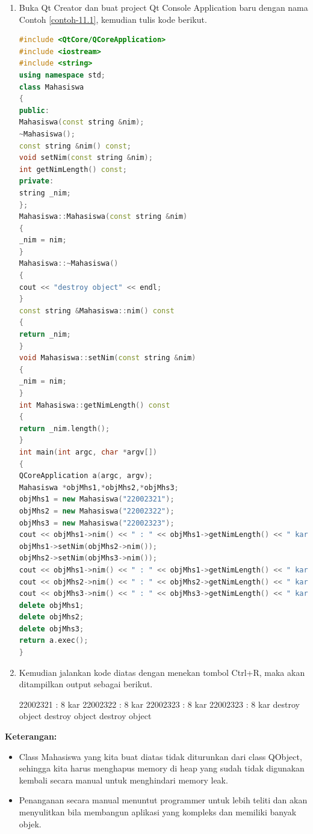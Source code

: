 \begin{enumerate}

\item
  Buka Qt Creator dan buat project Qt Console Application baru dengan
  nama Contoh \ref{contoh-11.1}, kemudian tulis kode berikut.

\begin{lstlisting}[language=c++, caption= Alokasi memory dinamis tanpa QObject, label=contoh-11.1]
#include <QtCore/QCoreApplication>
#include <iostream>
#include <string>
using namespace std;
class Mahasiswa
{
public:
Mahasiswa(const string &nim);
~Mahasiswa();
const string &nim() const;
void setNim(const string &nim);
int getNimLength() const;
private:
string _nim;
};
Mahasiswa::Mahasiswa(const string &nim)
{
_nim = nim;
}
Mahasiswa::~Mahasiswa()
{
cout << "destroy object" << endl;
}
const string &Mahasiswa::nim() const
{
return _nim;
}
void Mahasiswa::setNim(const string &nim)
{
_nim = nim;
}
int Mahasiswa::getNimLength() const
{
return _nim.length();
}
int main(int argc, char *argv[])
{
QCoreApplication a(argc, argv);
Mahasiswa *objMhs1,*objMhs2,*objMhs3;
objMhs1 = new Mahasiswa("22002321");
objMhs2 = new Mahasiswa("22002322");
objMhs3 = new Mahasiswa("22002323");
cout << objMhs1->nim() << " : " << objMhs1->getNimLength() << " kar" << endl;
objMhs1->setNim(objMhs2->nim());
objMhs2->setNim(objMhs3->nim());
cout << objMhs1->nim() << " : " << objMhs1->getNimLength() << " kar" << endl;
cout << objMhs2->nim() << " : " << objMhs2->getNimLength() << " kar" << endl;
cout << objMhs3->nim() << " : " << objMhs3->getNimLength() << " kar" << endl;
delete objMhs1;
delete objMhs2;
delete objMhs3;
return a.exec();
}
\end{lstlisting}
\item
  Kemudian jalankan kode diatas dengan menekan tombol Ctrl+R, maka akan
  ditampilkan output sebagai berikut.
  
  \begin{lcverbatim}
22002321 : 8 kar
22002322 : 8 kar
22002323 : 8 kar
22002323 : 8 kar
destroy object
destroy object
destroy object
  \end{lcverbatim}
\end{enumerate}

\textbf{Keterangan:}

\begin{itemize}

\item
  Class Mahasiswa yang kita buat diatas tidak diturunkan dari class
  QObject, sehingga kita harus menghapus memory di heap yang sudah tidak
  digunakan kembali secara manual untuk menghindari memory leak.
\item
  Penanganan secara manual menuntut programmer untuk lebih teliti dan
  akan menyulitkan bila membangun aplikasi yang kompleks dan memiliki
  banyak objek.
\end{itemize}

